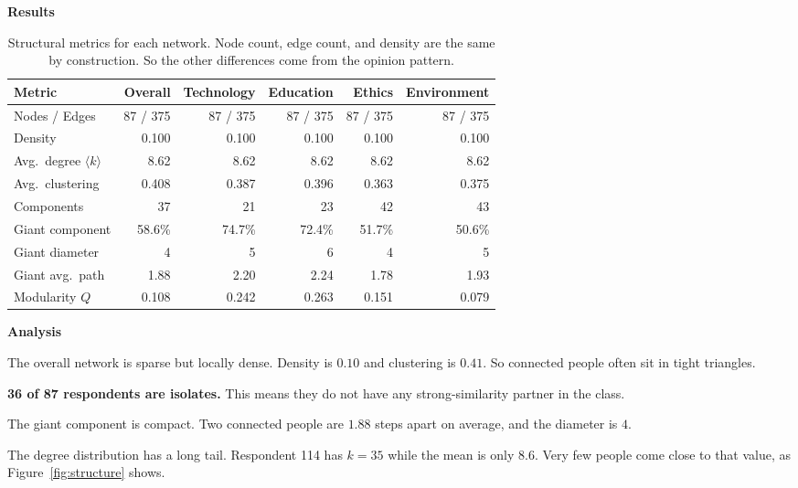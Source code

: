 \documentclass[11pt,a4paper]{article}
\newcommand{\gc}[1]{\cellcolor{hi}#1}
\newcommand{\rc}[1]{\cellcolor{lo}#1}
\newcommand{\lab}[1]{\textbf{#1}}
\begin{document}
\lab{Results}

\begin{table}[!ht]
\centering\small
\begin{tabular}{@{}lrrrrr@{}}
\toprule
\sffamily\bfseries Metric & \sffamily Overall & \sffamily Technology &
\sffamily Education & \sffamily Ethics & \sffamily Environment \\
\midrule
Nodes / Edges        & 87 / 375 & 87 / 375 & 87 / 375 & 87 / 375 & 87 / 375 \\
Density              & 0.100 & 0.100 & 0.100 & 0.100 & 0.100 \\
Avg.\ degree $\langle k\rangle$ & 8.62 & 8.62 & 8.62 & 8.62 & 8.62 \\
Avg.\ clustering     & \gc{0.408} & 0.387 & 0.396 & \rc{0.363} & 0.375 \\
Components           & 37 & \gc{21} & 23 & 42 & \rc{43} \\
Giant component      & 58.6\% & \gc{74.7\%} & 72.4\% & 51.7\% & \rc{50.6\%} \\
Giant diameter       & 4 & 5 & 6 & 4 & 5 \\
Giant avg.\ path     & 1.88 & 2.20 & 2.24 & 1.78 & 1.93 \\
Modularity $Q$       & 0.108 & 0.242 & \gc{0.263} & 0.151 & \rc{0.079} \\
\bottomrule
\end{tabular}
\caption{Structural metrics for each network. Node count, edge count, and
density are the same by construction. So the other differences come from the
opinion pattern.}
\label{tab:struct}
\end{table}

\lab{Analysis}
\begin{dash}
  \item The overall network is sparse but locally dense. Density is $0.10$ and
  clustering is $0.41$. So connected people often sit in tight triangles.
  \item \textbf{36 of 87 respondents are isolates.} This means they do not have
  any strong-similarity partner in the class.
  \item The giant component is compact. Two connected people are $1.88$ steps
  apart on average, and the diameter is $4$.
  \item The degree distribution has a long tail. Respondent 114 has $k=35$
  while the mean is only $8.6$. Very few people come close to that value, as
  Figure~\ref{fig:structure} shows.
\end{dash}
\end{document}
